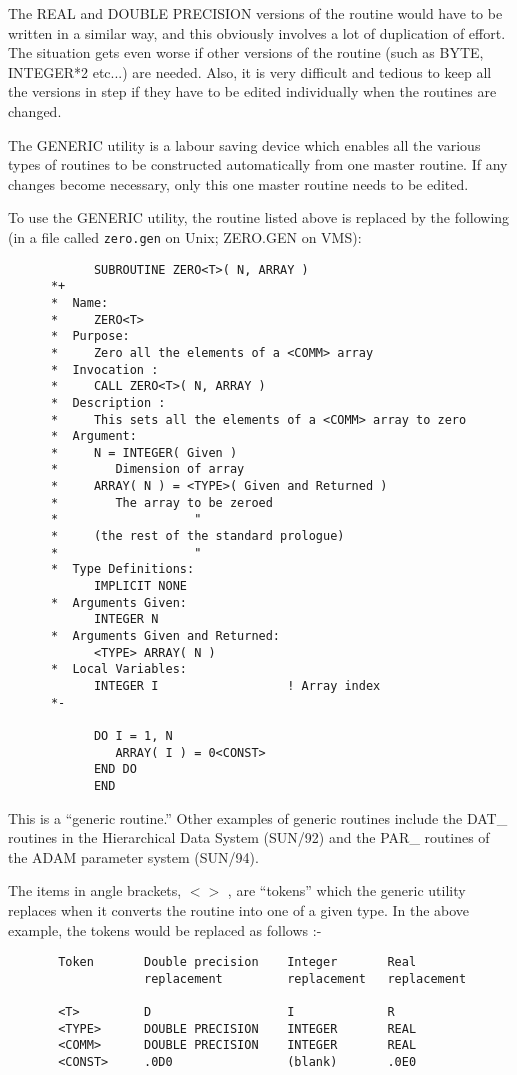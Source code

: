 The REAL and DOUBLE PRECISION versions of the routine would have to be
written in a similar way, and this obviously involves a lot of 
duplication of effort.
The situation gets even worse if other versions of the routine
(such as BYTE, INTEGER*2 etc...) are needed.
Also, it is very difficult and tedious to keep all the versions
in step if they have to be edited individually when the routines
are changed.

The GENERIC utility is a labour saving device which enables all the
various types of routines to be constructed automatically from
one master routine.
If any changes become necessary, only this one master routine needs
to be edited.

To use the GENERIC utility, the routine listed above is replaced by
the following (in a file called {\tt zero.gen} on Unix; ZERO.GEN on VMS):

\begin{verbatim}
            SUBROUTINE ZERO<T>( N, ARRAY )
      *+
      *  Name:
      *     ZERO<T>
      *  Purpose:
      *     Zero all the elements of a <COMM> array
      *  Invocation :
      *     CALL ZERO<T>( N, ARRAY )
      *  Description :
      *     This sets all the elements of a <COMM> array to zero
      *  Argument:
      *     N = INTEGER( Given )
      *        Dimension of array
      *     ARRAY( N ) = <TYPE>( Given and Returned )
      *        The array to be zeroed
      *                   "
      *     (the rest of the standard prologue)
      *                   "
      *  Type Definitions:
            IMPLICIT NONE
      *  Arguments Given:
            INTEGER N
      *  Arguments Given and Returned:
            <TYPE> ARRAY( N )
      *  Local Variables:
            INTEGER I                  ! Array index
      *-
      
            DO I = 1, N
               ARRAY( I ) = 0<CONST>
            END DO
            END
\end{verbatim}

This is a ``generic routine.''
Other examples of generic routines include the DAT\_ routines in
the Hierarchical Data System (SUN/92) and the PAR\_ routines of
the ADAM parameter system (SUN/94).

The items in angle brackets, $<>$ , are ``tokens'' which the generic
utility replaces when it converts the routine into one of a given
type.
In the above example, the tokens would be replaced
as follows :-

\begin{verbatim}
       Token       Double precision    Integer       Real
                   replacement         replacement   replacement

       <T>         D                   I             R
       <TYPE>      DOUBLE PRECISION    INTEGER       REAL
       <COMM>      DOUBLE PRECISION    INTEGER       REAL
       <CONST>     .0D0                (blank)       .0E0
\end{verbatim}

